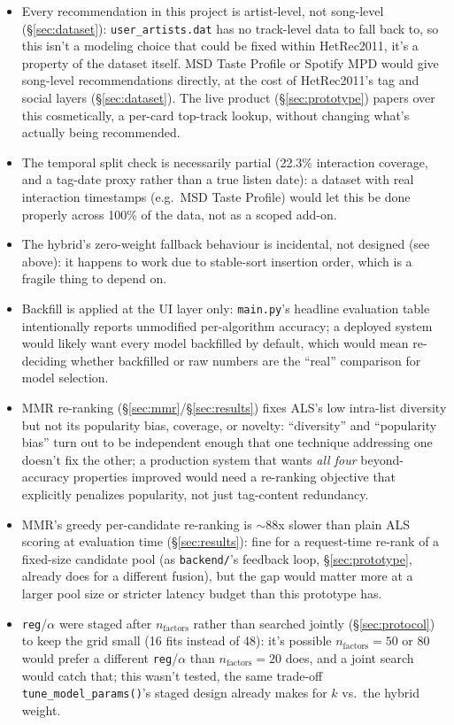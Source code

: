 \documentclass[11pt,a4paper]{article}
\newcommand{\code}[1]{\texttt{#1}}
\newcommand{\secref}[1]{\S\ref{#1}}
\begin{document}
\begin{itemize}[leftmargin=*]
  \item Every recommendation in this project is artist-level, not song-level (\secref{sec:dataset}): \code{user\_artists.dat} has no track-level data to fall back to, so this isn't a modeling choice that could be fixed within HetRec2011, it's a property of the dataset itself. MSD Taste Profile or Spotify MPD would give song-level recommendations directly, at the cost of HetRec2011's tag and social layers (\secref{sec:dataset}). The live product (\secref{sec:prototype}) papers over this cosmetically, a per-card top-track lookup, without changing what's actually being recommended.
  \item The temporal split check is necessarily partial (22.3\% interaction coverage, and a tag-date proxy rather than a true listen date): a dataset with real interaction timestamps (e.g.\ MSD Taste Profile) would let this be done properly across 100\% of the data, not as a scoped add-on.
  \item The hybrid's zero-weight fallback behaviour is incidental, not designed (see above): it happens to work due to stable-sort insertion order, which is a fragile thing to depend on.
  \item Backfill is applied at the UI layer only: \code{main.py}'s headline evaluation table intentionally reports unmodified per-algorithm accuracy; a deployed system would likely want every model backfilled by default, which would mean re-deciding whether backfilled or raw numbers are the ``real'' comparison for model selection.
  \item MMR re-ranking (\secref{sec:mmr}/\secref{sec:results}) fixes ALS's low intra-list diversity but not its popularity bias, coverage, or novelty: ``diversity'' and ``popularity bias'' turn out to be independent enough that one technique addressing one doesn't fix the other; a production system that wants \emph{all four} beyond-accuracy properties improved would need a re-ranking objective that explicitly penalizes popularity, not just tag-content redundancy.
  \item MMR's greedy per-candidate re-ranking is $\sim$88x slower than plain ALS scoring at evaluation time (\secref{sec:results}): fine for a request-time re-rank of a fixed-size candidate pool (as \code{backend/}'s feedback loop, \secref{sec:prototype}, already does for a different fusion), but the gap would matter more at a larger pool size or stricter latency budget than this prototype has.
  \item \code{reg}/$\alpha$ were staged after $n_{\text{factors}}$ rather than searched jointly (\secref{sec:protocol}) to keep the grid small (16 fits instead of 48): it's possible $n_{\text{factors}}=50$ or $80$ would prefer a different \code{reg}/$\alpha$ than $n_{\text{factors}}=20$ does, and a joint search would catch that; this wasn't tested, the same trade-off \code{tune\_model\_params()}'s staged design already makes for $k$ vs.\ the hybrid weight.

\end{itemize}
\end{document}
